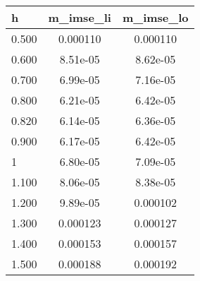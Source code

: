 \documentclass[]{article}
\begin{document}
\begin{tabular}{lcc} \hline
h & m\_imse\_li & m\_imse\_lo \\ \hline
0.500 & 0.000110 & 0.000110 \\
0.600 & 8.51e-05 & 8.62e-05 \\
0.700 & 6.99e-05 & 7.16e-05 \\
0.800 & 6.21e-05 & 6.42e-05 \\
0.820 & 6.14e-05 & 6.36e-05 \\
0.900 & 6.17e-05 & 6.42e-05 \\
1 & 6.80e-05 & 7.09e-05 \\
1.100 & 8.06e-05 & 8.38e-05 \\
1.200 & 9.89e-05 & 0.000102 \\
1.300 & 0.000123 & 0.000127 \\
1.400 & 0.000153 & 0.000157 \\
 1.500 & 0.000188 & 0.000192 \\ \hline
\end{tabular}
\end{document}
